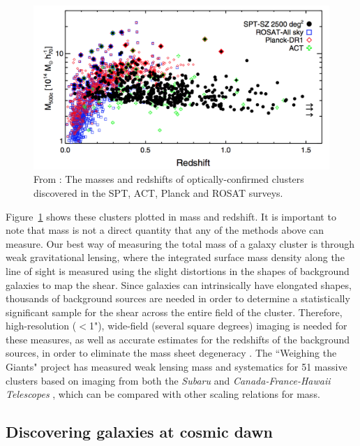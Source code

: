 \begin{figure}
\centering
\includegraphics[width=\textwidth]{Intro/spt.png}
\caption[Masses and redshifts of cluster detections]{From \citet{Bleem:2015gf}: The masses and redshifts of optically-confirmed clusters discovered in the SPT, ACT, Planck and ROSAT surveys.}
\label{intro:fig:cluster_detections}
\end{figure}

Figure~\ref{intro:fig:cluster_detections} shows these clusters plotted in mass and redshift. It is important to note that mass is not a direct quantity that any of the methods above can measure. Our best way of measuring the total mass of a galaxy cluster is through weak gravitational lensing, where the integrated surface mass density along the line of sight is measured using the slight distortions in the shapes of background galaxies to map the shear. Since galaxies can intrinsically have elongated shapes, thousands of background sources are needed in order to determine a statistically significant sample for the shear across the entire field of the cluster. Therefore, high-resolution ($<$1"), wide-field (several square degrees) imaging is needed for these measures, as well as accurate estimates for the redshifts of the background sources, in order to eliminate the mass sheet degeneracy \citep{Schneider:1995vn}. The ``Weighing the Giants" project has measured weak lensing mass and systematics for 51 massive clusters based on imaging from both the {\it Subaru} and {\it Canada-France-Hawaii Telescopes} \citep{von-der-Linden:2014wd}, which can be compared with other scaling relations for mass.

\subsection{Discovering galaxies at cosmic dawn}

